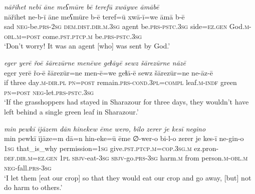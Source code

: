 \ea \label{PM.34}
\textit{nāřihet nebī āne meʕmūre bē terefū xwāywe āmābē} \\ 
\gll nāřihet ne-b-ī āne meʕmūre b-ē teref=ū xwā-ī=we āmā b-ē \\ 
 sad \textsc{neg-}be\textsc{.prs}-\textsc{2sg} \textsc{dem.dist}\textsc{.dir}\textsc{.m}\textsc{.3sg} agent be\textsc{.prs}\textsc{-pstc}\textsc{.3sg} side\textsc{\textsc{=ez.gen}} God\textsc{.m}\textsc{-obl}\textsc{.m}\textsc{=\textsc{post}} come\textsc{.pst}\textsc{.ptcp}\textsc{.m} be\textsc{.prs}\textsc{-pstc}\textsc{.3sg} \\ 
\glt `Don’t worry! It was an agent [who] was sent  by God.'
\z 
 
\ea \label{PM.35}
\textit{eger yerē řoē šārezūrne menēwe geɫāyē sewz šārezūrne nāzē} \\ 
\gll eger yerē řo-ē šārezūr=ne men-ē=we geɫā-ē sewz šārezūr=ne ne-āz-ē \\ 
 if three day\textsc{.m}\textsc{-dir}\textsc{.pl} \textsc{pn}\textsc{=\textsc{post}} remain\textsc{.prs}\textsc{-cond}\textsc{.3pl}\textsc{=compl} leaf\textsc{.m}\textsc{-indf} green \textsc{pn}\textsc{=\textsc{post}} \textsc{neg-}let\textsc{.prs}\textsc{-pstc}\textsc{.3sg} \\ 
\glt `If the grasshoppers had stayed in Sharazour for three days, they wouldn’t have left behind a single green leaf in Sharazour.'
\z 
 
\ea \label{PM.36}
\textit{min pewkī ījāzem dān hinekew ēme wero, bilo zerer je kesī negino} \\ 
\gll min pewkī ījāze=m dā=n hin-eke=ū ēme ∅-wer-o bi-l-o zerer je kes-ī ne-gin-o \\ 
 \textsc{1sg} that\_is\_why permission\textsc{=\textsc{1sg}} give\textsc{.pst}\textsc{.ptcp}\textsc{.m}\textsc{=cop}\textsc{.3sg}\textsc{.m} ez.pron\textsc{-def}\textsc{.dir}\textsc{.m}\textsc{\textsc{=ez.gen}} \textsc{1pl} \textsc{sbjv-}eat\textsc{-3sg} \textsc{sbjv-}go\textsc{.prs}\textsc{-3sg} harm\textsc{.m} from person\textsc{.m}\textsc{-obl}\textsc{.m} \textsc{neg-}fall\textsc{.prs}\textsc{-3sg} \\ 
\glt `I let them [eat our crop] so that they would eat our crop and go away, [but] not do harm to others.'
\z 
 
